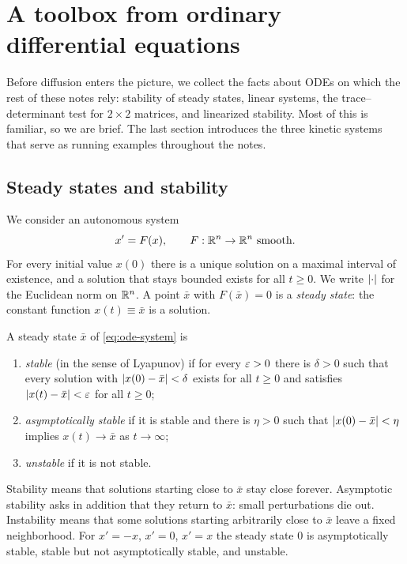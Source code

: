 \chapter{A toolbox from ordinary differential equations}\label{ch:ode-toolbox}

Before diffusion enters the picture, we collect the facts about ODEs on which the
rest of these notes rely: stability of steady states, linear systems, the
trace--determinant test for $2\times2$ matrices, and linearized stability. Most of
this is familiar, so we are brief. The last section introduces the three kinetic
systems that serve as running examples throughout the notes.

\section{Steady states and stability}\label{sec:ode-stability}

We consider an autonomous system
\begin{equation}\label{eq:ode-system}
  x' = F(x),\qquad F:\mathbb{R}^n\to\mathbb{R}^n \text{ smooth}.
\end{equation}
For every initial value $x(0)$ there is a unique solution on a maximal interval
of existence, and a solution that stays bounded exists for all $t\ge0$. We write
$\left\lvert \cdot\right\rvert$ for the Euclidean norm on $\mathbb{R}^n$. A point $\bar x$ with
$F(\bar x)=0$ is a \emph{steady state}: the constant function $x(t)\equiv\bar x$
is a solution.

\begin{definition}\label{def:stability-ode}
A steady state $\bar x$ of \eqref{eq:ode-system} is
\begin{enumerate}[label=(\roman*)]
  \item \emph{stable} (in the sense of Lyapunov) if for every $\varepsilon>0$ there is
        $\delta>0$ such that every solution with $\left\lvert x(0)-\bar x\right\rvert<\delta$ exists
        for all $t\ge0$ and satisfies $\left\lvert x(t)-\bar x\right\rvert<\varepsilon$ for all $t\ge0$;
  \item \emph{asymptotically stable} if it is stable and there is $\eta>0$ such
        that $\left\lvert x(0)-\bar x\right\rvert<\eta$ implies $x(t)\to\bar x$ as $t\to\infty$;
  \item \emph{unstable} if it is not stable.
\end{enumerate}
\end{definition}

Stability means that solutions starting close to $\bar x$ stay close forever.
Asymptotic stability asks in addition that they return to $\bar x$: small
perturbations die out. Instability means that some solutions starting
arbitrarily close to $\bar x$ leave a fixed neighborhood. For $x'=-x$, $x'=0$,
$x'=x$ the steady state $0$ is asymptotically stable, stable but not
asymptotically stable, and unstable.

